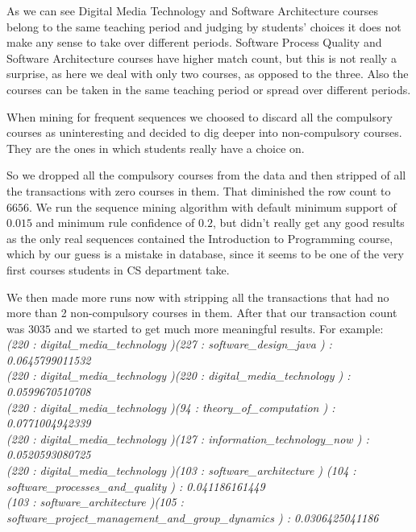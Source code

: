 As we can see Digital Media Technology and Software Architecture courses belong to the same teaching period and judging by students’ choices it does not make any sense to take over different periods. Software Process Quality and Software Architecture courses have higher match count, but this is not really a surprise, as here we deal with only two courses, as opposed to the three. Also the courses can be taken in the same teaching period or spread over different periods.

When mining for frequent sequences we choosed to discard all the compulsory courses as uninteresting and
decided to dig deeper into non-compulsory courses. They are the ones in which students really have a choice on.

So we dropped all the compulsory courses from the data and then stripped of all the transactions with zero 
courses in them. That diminished the row count to $6656$. We run the sequence mining algorithm with default 
minimum support of $0.015$ and minimum rule confidence of $0.2$, but didn't really get any good results as the
only real sequences contained the Introduction to Programming course, which by our guess is a mistake in database,
since it seems to be one of the very first courses students in CS department take.

We then made more runs now with stripping all the transactions that had no more than 2 non-compulsory courses in them.
After that our transaction count was $3035$ and we started to get much more meaningful results. For example:\\

\textit{
(220 : digital\_media\_technology )(227 : software\_design\_java ) : \\
0.0645799011532\\
(220 : digital\_media\_technology )(220 : digital\_media\_technology ) :\\ 
0.0599670510708\\
(220 : digital\_media\_technology )(94 : theory\_of\_computation ) :  \\
0.0771004942339\\
(220 : digital\_media\_technology )(127 : information\_technology\_now ) : \\  
0.0520593080725\\
(220 : digital\_media\_technology )(103 : software\_architecture )
(104 : software\_processes\_and\_quality ) :  0.041186161449\\
(103 : software\_architecture )(105 : software\_project\_management\_and\_group\_dynamics ) :  
0.0306425041186
}\\



